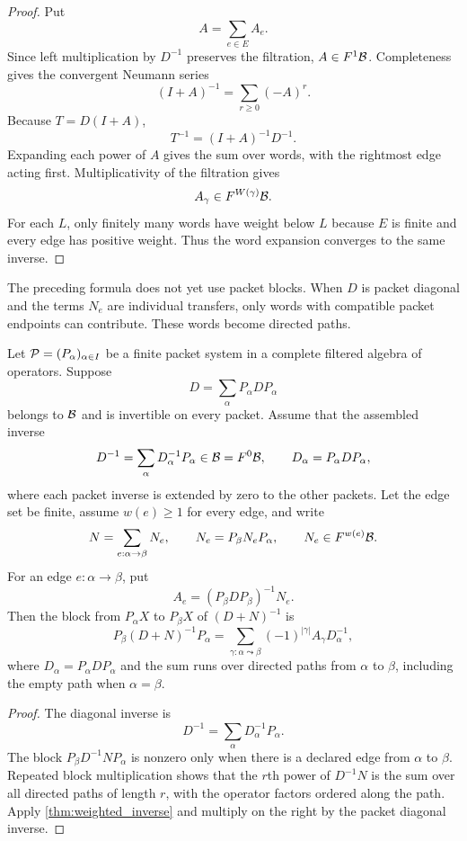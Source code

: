 \begin{proof}
Put
\[
A=\sum_{e\in E}A_e.
\]
Since left multiplication by $D^{-1}$ preserves the filtration, $A\in F^1\mathcal B$.  Completeness gives the convergent Neumann series
\[
(I+A)^{-1}=\sum_{r\geq0}(-A)^r.
\]
Because $T=D(I+A)$,
\[
T^{-1}=(I+A)^{-1}D^{-1}.
\]
Expanding each power of $A$ gives the sum over words, with the rightmost edge acting first.  Multiplicativity of the filtration gives
\[
A_\gamma\in F^{W(\gamma)}\mathcal B.
\]
For each $L$, only finitely many words have weight below $L$ because $E$ is finite and every edge has positive weight.  Thus the word expansion converges to the same inverse.
\end{proof}

The preceding formula does not yet use packet blocks. When $D$ is packet diagonal and the terms $N_e$ are individual transfers, only words with compatible packet endpoints can contribute. These words become directed paths.

\begin{theorem}\label{thm:block_path_formula}
Let $\mathcal P=(P_\alpha)_{\alpha\in I}$ be a finite packet system in a complete filtered algebra of operators.  Suppose
\[
D=\sum_\alpha P_\alpha D P_\alpha
\]
belongs to $\mathcal B$ and is invertible on every packet.  Assume that the assembled inverse
\[
D^{-1}=\sum_\alpha D_\alpha^{-1}P_\alpha\in\mathcal B=F^0\mathcal B,
\qquad D_\alpha=P_\alpha DP_\alpha,
\]
where each packet inverse is extended by zero to the other packets.  Let the edge set be finite, assume $w(e)\geq1$ for every edge, and write
\[
N=\sum_{e:\alpha\to\beta}N_e,
\qquad
N_e=P_\beta N_eP_\alpha,
\qquad
N_e\in F^{w(e)}\mathcal B.
\]
For an edge $e:\alpha\to\beta$, put
\[
A_e=(P_\beta DP_\beta)^{-1}N_e.
\]
Then the block from $P_\alpha X$ to $P_\beta X$ of $(D+N)^{-1}$ is
\[
P_\beta(D+N)^{-1}P_\alpha
=
\sum_{\gamma:\alpha\leadsto\beta}
(-1)^{|\gamma|}A_\gamma D_\alpha^{-1},
\]
where $D_\alpha=P_\alpha DP_\alpha$ and the sum runs over directed paths from $\alpha$ to $\beta$, including the empty path when $\alpha=\beta$.
\end{theorem}

\begin{proof}
The diagonal inverse is
\[
D^{-1}=\sum_\alpha D_\alpha^{-1}P_\alpha.
\]
The block $P_\beta D^{-1}NP_\alpha$ is nonzero only when there is a declared edge from $\alpha$ to $\beta$.  Repeated block multiplication shows that the $r$th power of $D^{-1}N$ is the sum over all directed paths of length $r$, with the operator factors ordered along the path.  Apply \cref{thm:weighted_inverse} and multiply on the right by the packet diagonal inverse.
\end{proof}

